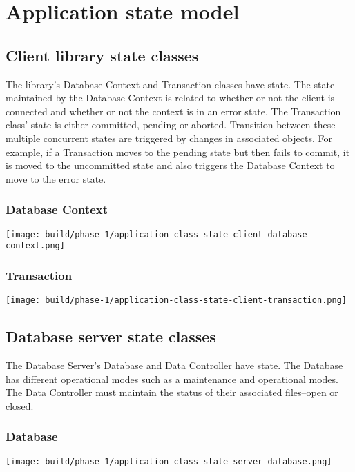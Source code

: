 \documentclass[a4paper]{report}
\begin{document}
\chapter{Application state model}

\section{Client library state classes}

	The library's Database Context and Transaction classes have state. The state maintained by the Database Context is related to whether or not the client is connected and whether or not the context is in an error state. The Transaction class' state is either committed, pending or aborted. Transition between these multiple concurrent states are triggered by changes in associated objects. For example, if a Transaction moves to the pending state but then fails to commit, it is moved to the uncommitted state and also triggers the Database Context to move to the error state.

	\pagebreak

	\subsection{Database Context}
		\texttt{[image: build/phase-1/application-class-state-client-database-context.png]}
	\subsection{Transaction}
		\texttt{[image: build/phase-1/application-class-state-client-transaction.png]}

	\pagebreak

\section{Database server state classes}

	The Database Server's Database and Data Controller have state. The Database has different operational modes such as a maintenance and operational modes. The Data Controller must maintain the status of their associated files--open or closed.

	\subsection{Database}
		\texttt{[image: build/phase-1/application-class-state-server-database.png]}
\end{document}
